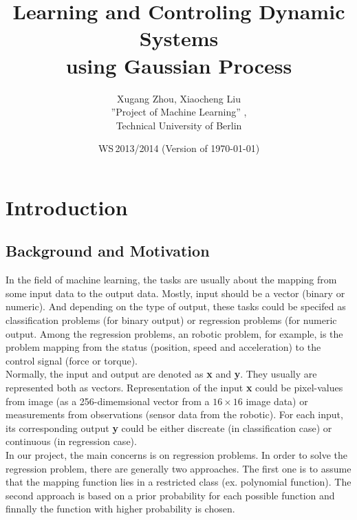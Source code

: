 \documentclass[11pt,twoside,a4paper]{article}
\begin{document}
\title{Learning and Controling Dynamic Systems \\using Gaussian Process}
\author{Xugang Zhou, Xiaocheng Liu \\
  ''Project of Machine Learning'' , \\
  Technical University of Berlin
}
  
\date{WS\,2013/2014 (Version of \today)}

\maketitle


\section{Introduction}
\subsection{Background and Motivation}

In the field of machine learning, the tasks are usually about the mapping from
some input data to the output data. Mostly, input should be a vector
(binary or numeric). And depending on the type of output, these
tasks could be specifed as classification problems (for binary output)
or regression problems (for numeric output.  Among the regression
problems, an robotic problem, for example, is the problem mapping from
the status (position, speed and acceleration) to the control signal
(force or torque).\\

Normally, the input and output are denoted as \textbf{x} and \textbf{y}. They
usually are represented both as vectors. Representation of the input
\textbf{x} could be pixel-values from image (as a 256-dimemsional vector from a $16
\times 16$ image data) or measurements from observations (sensor data
from the robotic). For each input, its corresponding output \textbf{y} could be either
discreate (in classification case) or continuous (in regression
case).\\

In our project, the main concerns is on regression problems.
In order to solve the regression problem, there are generally two
approaches. The first one is to assume that the mapping function lies in a
restricted class (ex. polynomial function). The second approach is
based on a prior probability for each possible function and finnally
the function with higher probability is chosen.\\
\end{document}
